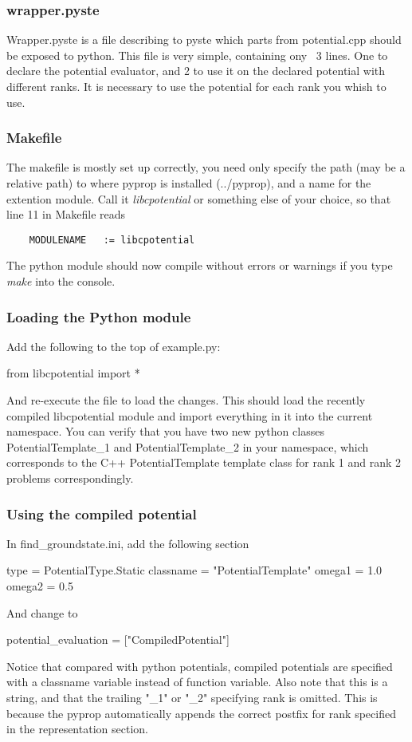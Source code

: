 \subsubsection*{wrapper.pyste}
Wrapper.pyste is a file describing to pyste which parts from potential.cpp should be exposed to python. This file is very
simple, containing ony ~3 lines. One to declare the potential evaluator, and 2 to use it on the declared potential with
different ranks. It is necessary to use the potential for each rank you whish to use. 

\subsubsection*{Makefile}
The makefile is mostly set up correctly, you need only specify the path (may be a relative path) to where pyprop 
is installed (../pyprop), and a name for the extention module. Call it \textit{libcpotential} or something else of your
choice, so that line 11 in Makefile reads
\begin{verbatim}
	MODULENAME   := libcpotential
\end{verbatim}

The python module should now compile without errors or warnings if you type \textit{make} into the console.

\subsubsection*{Loading the Python module}
Add the following to the top of example.py:
\begin{python}
	from libcpotential import *
\end{python}
And re-execute the file to load the changes. 
This should load the recently compiled libcpotential module and import everything in it into the current namespace.
You can verify that you have two new python classes PotentialTemplate\_1 and PotentialTemplate\_2 in your namespace, which 
corresponds to the C++ PotentialTemplate template class for rank 1 and rank 2 problems correspondingly.

\subsubsection*{Using the compiled potential}
In find\_groundstate.ini, add the following section
\begin{python}
	[CompiledPotential]
	type = PotentialType.Static
	classname = "PotentialTemplate"
	omega1 = 1.0
	omega2 = 0.5
\end{python}
And change  to 
\begin{python}
	potential_evaluation = ["CompiledPotential"]
\end{python}
Notice that compared with python potentials, compiled potentials are specified with a classname variable instead of function
variable. Also note that this is a string, and that the trailing "\_1" or "\_2" specifying rank is omitted. This is because
the pyprop automatically appends the correct postfix for rank specified in the representation section.

